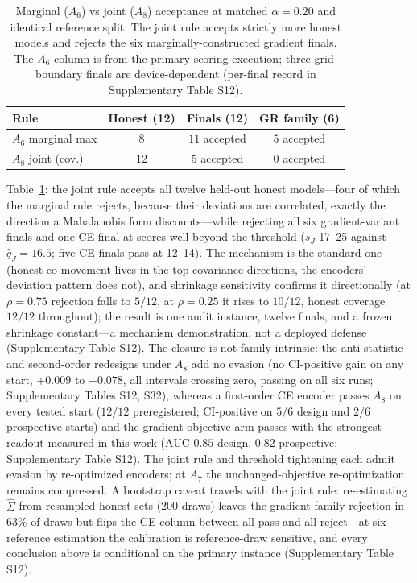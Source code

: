 \documentclass[lettersize,journal]{IEEEtran}
\begin{document}
\begin{table}[t]
\caption{Marginal ($A_6$) vs joint ($A_8$) acceptance at matched
$\alpha{=}0.20$ and identical reference split. The joint rule
accepts strictly more honest models and rejects the six
marginally-constructed gradient finals. The $A_6$ column is
from the primary scoring execution; three grid-boundary
finals are device-dependent (per-final record in
Supplementary Table S12).}
\label{tab:a8}
\centering
\small
\begin{tabular}{lccc}
\toprule
Rule & Honest (12) & Finals (12) & GR family (6) \\
\midrule
$A_6$ marginal max & $8$ & $11$ accepted & $5$ accepted \\
$A_8$ joint (cov.) & $12$ & $5$ accepted & $0$ accepted \\
\bottomrule
\end{tabular}
\end{table}

Table~\ref{tab:a8}: the joint rule accepts all twelve held-out
honest models---four of which the marginal rule rejects,
because their deviations are correlated, exactly the direction
a Mahalanobis form discounts---while rejecting all six
gradient-variant finals and one CE final at scores well beyond
the threshold ($s_J$ 17--25 against $\hat q_J{=}16.5$; five
CE finals pass at 12--14). The mechanism is the standard one
(honest co-movement lives in the top covariance directions,
the encoders' deviation pattern does not), and shrinkage
sensitivity confirms it directionally (at $\rho{=}0.75$
rejection falls to $5/12$, at $\rho{=}0.25$ it rises to
$10/12$, honest coverage $12/12$ throughout); the result is
one audit instance, twelve finals, and a frozen shrinkage
constant---a mechanism demonstration, not a deployed defense
(Supplementary Table S12). The closure is not
family-intrinsic: the anti-statistic and second-order
redesigns under $A_8$ add no evasion (no CI-positive gain on
any start, $+0.009$ to $+0.078$, all intervals crossing zero,
passing on all six runs; Supplementary Tables S12, S32),
whereas a first-order CE encoder passes $A_8$ on every tested
start ($12/12$ preregistered; CI-positive on $5/6$ design and
$2/6$ prospective starts) and the gradient-objective arm
passes with the strongest readout measured in this work (AUC
$0.85$ design, $0.82$ prospective; Supplementary Table S12).
The joint rule and threshold tightening each admit evasion by
re-optimized encoders; at $A_7$ the unchanged-objective
re-optimization remains compressed. A bootstrap caveat
travels with the joint rule: re-estimating $\hat\Sigma$ from
resampled honest sets (200 draws) leaves the gradient-family
rejection in 63\% of draws but flips the CE column between
all-pass and all-reject---at six-reference estimation the
calibration is reference-draw sensitive, and every conclusion
above is conditional on the primary instance (Supplementary
Table S12).
\end{document}
